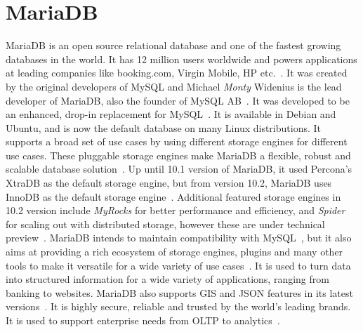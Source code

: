 \section{MariaDB}

MariaDB is an open source relational database and one of the fastest growing
databases in the world. It has 12 million users worldwide and powers
applications at leading companies like booking.com, Virgin Mobile, HP
etc.~\cite{hid-sp18-516-www-mariadb}. It was created by the original developers
of MySQL and Michael \textit{Monty} Widenius is the lead developer of MariaDB,
also the founder of MySQL AB~\cite{hid-sp18-516-www-wiki-mariadb}. It was
developed to be an enhanced, drop-in replacement for 
MySQL~\cite{hid-sp18-516-www-mariadb-foundation}. It is available in Debian and
Ubuntu, and is now the default database on many Linux distributions. It supports 
a broad set of use cases by using different storage engines for different use 
cases. These pluggable storage engines make MariaDB a flexible, robust and 
scalable database solution~\cite{hid-sp18-516-www-mariadb-server}. Up until 10.1 
version of MariaDB, it used Percona's XtraDB as the default storage engine, but 
from version 10.2, MariaDB uses InnoDB as the default storage
engine~\cite{hid-sp18-516-www-wiki-xtradb}. Additional featured storage engines
in 10.2 version include \textit{MyRocks} for better performance and efficiency,
and \textit{Spider} for scaling out with distributed storage, however these are
under technical preview~\cite{hid-sp18-516-www-mariadb-server}. MariaDB intends
to maintain compatibility with MySQL~\cite{hid-sp18-516-www-wiki-mariadb}, but
it also aims at providing a rich ecosystem of storage engines, plugins and many
other tools to make it versatile for a wide variety of use
cases~\cite{hid-sp18-516-www-mariadb-foundation}. It is used to turn data into
structured information for a wide variety of applications, ranging from banking
to websites. MariaDB also supports GIS and JSON features in its latest
versions~\cite{hid-sp18-516-www-mariadb-foundation}. It is highly secure,
reliable and trusted by the world's leading brands. It is used to support
enterprise needs from OLTP to analytics~\cite{hid-sp18-516-www-mariadb}.
